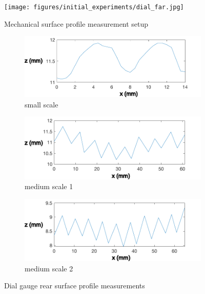 \documentclass[12pt]{report}
\begin{document}
\begin{figure}
    \centering
    \texttt{[image: figures/initial\_experiments/dial\_far.jpg]}
    \caption{Mechanical surface profile measurement setup}
    \label{fig:my_label}
\end{figure}

\begin{figure}[ht]
    \begin{subfigure}{\textwidth}
        \centering
        \includegraphics[width=0.8\linewidth]{figures/initial_experiments/small_mechanical.pdf}  
        \caption{small scale}
        \label{fig:dial_gauge_s}
    \end{subfigure}
    \newline
    \begin{subfigure}{\textwidth}
        \centering
        \includegraphics[width=0.8\linewidth]{figures/initial_experiments/med_mechanical.pdf}  
        \caption{medium scale 1}
        \label{fig:dial_gauge_m1}
    \end{subfigure}
    \newline
    \begin{subfigure}{\textwidth}
        \centering
        \includegraphics[width=0.8\linewidth]{figures/initial_experiments/med_mechanical_2.pdf}  
        \caption{medium scale 2}
        \label{fig:dial_gauge_m2}
    \end{subfigure}
    \caption{Dial gauge rear surface profile measurements}
    \label{fig:dial_gauge}
\end{figure}
\end{document}
